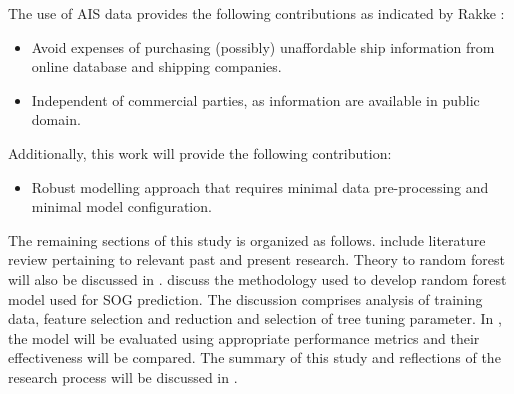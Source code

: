 The use of AIS data provides the following contributions as indicated by Rakke \cite{Rakke2016}: 

\begin{itemize}
    \item Avoid expenses of purchasing (possibly) unaffordable ship information from online database and shipping companies. 
    \item Independent of commercial parties, as information are available in public domain.
\end{itemize}

Additionally, this work will provide the following contribution:

\begin{itemize}
    \item Robust modelling approach that requires minimal data pre-processing and minimal model configuration.
\end{itemize} 

The remaining sections of this study is organized as follows.  include literature review pertaining to relevant past and present research. Theory to random forest will also be discussed in .  discuss the methodology used to develop random forest model used for SOG prediction. The discussion comprises analysis of training data, feature selection and reduction and selection of tree tuning parameter. In , the model will be evaluated using appropriate performance metrics and their effectiveness will be compared. The summary of this study and reflections of the research process will be discussed in .






 






